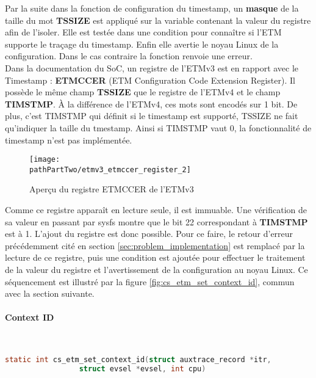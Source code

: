 Par la suite dans la fonction de configuration du timestamp, un
\textbf{masque} de la taille du mot \textbf{TSSIZE} est appliqué sur la
variable contenant la valeur du registre afin de l'isoler. Elle est testée
dans une condition pour connaître si l'ETM supporte le traçage du timestamp.
Enfin elle avertie le noyau Linux de la configuration. Dans le cas contraire
la fonction renvoie une erreur. \\

Dans la documentation du SoC, un registre de l'ETMv3 est en rapport avec le
Timestamp : \textbf{ETMCCER} (ETM Configuration Code Extension Register).  Il
possède le même champ \textbf{TSSIZE} que le registre de l'ETMv4 et le champ
\textbf{TIMSTMP}. À la différence de l'ETMv4, ces mots sont encodés sur 1 bit.
De plus, c'est TIMSTMP qui définit si le timestamp est supporté, TSSIZE ne
fait qu'indiquer la taille du tmestamp. Ainsi si TIMSTMP vaut 0, la
fonctionnalité de timestamp n'est pas implémentée.

\begin{figure}[H]
	\begin{center}
		\texttt{[image: \\pathPartTwo/etmv3\_etmccer\_register\_2]}
		\caption{Aperçu du registre ETMCCER de l'ETMv3}
	    \label{fig:etmv3_etmccer_register}
	\end{center}
\end{figure}

Comme ce registre apparaît en lecture seule, il est immuable. Une vérification
de sa valeur en passant par sysfs montre que le bit 22 correspondant à
\textbf{TIMSTMP} est à 1. L'ajout du registre est donc possible. Pour ce
faire, le retour d'erreur précédemment cité en section
\ref{sec:problem_implementation} est remplacé par la lecture de ce registre,
puis une condition est ajoutée pour effectuer le traitement de la valeur du
registre et l'avertissement de la configuration au noyau Linux. Ce
séquencement est illustré par la figure \ref{fig:cs_etm_set_context_id},
commun avec la section suivante.

\paragraph{Context ID}\mbox{}\\
\label{par:contextid}

\begin{lstlisting}[language=C]
static int cs_etm_set_context_id(struct auxtrace_record *itr,
				 struct evsel *evsel, int cpu)
\end{lstlisting}

